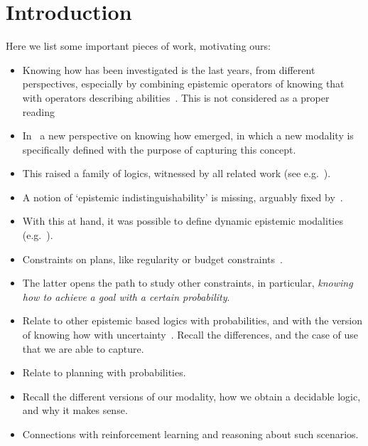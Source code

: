 \section{Introduction}
\label{sec:intro}

Here we list some important pieces of work, motivating ours:

\begin{itemize}
    \item Knowing how has been investigated is the last years, from different perspectives, especially by combining epistemic operators of knowing that with operators describing abilities~\cite{Mccarthy69,Moore85,Les00,Hoek00,HerzigT06}. This is not considered as a proper reading~\cite{JamrogaA07,Herzig15}
    \item In~\cite{Wang15lori,Wang16,Wang2016} a new perspective on knowing how emerged, in which a new modality is specifically defined with the purpose of capturing this concept.
    \item This raised a family of logics, witnessed by all related work (see e.g.~\cite{LiWang17,Li17,Li17bis,FervariHLW17,LiW21,NaumovT17,NaumovT18,NaumovT19,Naumov2018a}).
    \item A notion of `epistemic indistinguishability' is missing, arguably fixed by~\cite{AFSVQ21,AFSVQ23}.
    \item With this at hand, it was possible to define dynamic epistemic modalities (e.g.~\cite{AFSV22}).
    \item Constraints on plans, like regularity or budget constraints~\cite{DemriF23}.
    \item The latter opens the path to study other constraints, in particular, \emph{knowing how to achieve a goal with a certain probability}.
    \item Relate to other epistemic based logics with probabilities, and with the version of knowing how with uncertainty~\cite{NaumovT19}. Recall the differences, and the case of use that we are able to capture.
    \item Relate to planning with probabilities.
    \item Recall the different versions of our modality, how we obtain a decidable logic, and why it makes sense.
    \item Connections with reinforcement learning and reasoning about such scenarios.
\end{itemize}